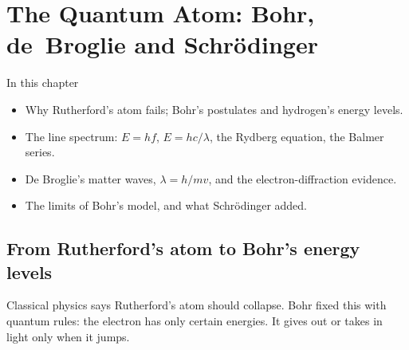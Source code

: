 \chapter[The Quantum Atom]{The Quantum Atom: Bohr, de~Broglie and Schrödinger}\label{ch3:chap}

\begin{summarybox}{In this chapter}
\begin{itemize}
  \item Why Rutherford's atom fails; Bohr's postulates and hydrogen's energy levels.
  \item The line spectrum: $E = hf$, $E = hc/\lambda$, the Rydberg equation, the Balmer series.
  \item De Broglie's matter waves, $\lambda = h/mv$, and the electron-diffraction evidence.
  \item The limits of Bohr's model, and what Schrödinger added.
\end{itemize}
\end{summarybox}

\section{From Rutherford's atom to Bohr's energy levels}\label{ch3:sec:bohr}

\begin{bigidea}
Classical physics says Rutherford's atom should collapse. Bohr fixed this with quantum rules:
the electron has only certain energies. It gives out or takes in light only when it jumps.
\end{bigidea}

\begin{keywords}
\end{keywords}


